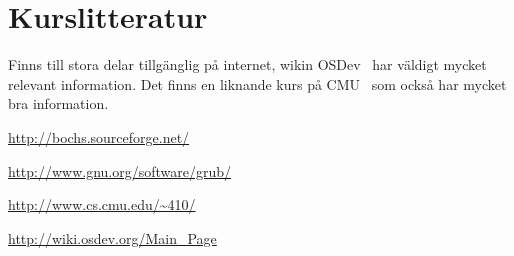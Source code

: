 \documentclass[11pt,oneside,a4paper]{article}
\begin{document}
\section{Kurslitteratur}
Finns till stora delar tillgänglig på internet, wikin OSDev~\cite{os}
 har väldigt mycket relevant information.
Det finns en liknande kurs på CMU~\cite{cmu} som också
har mycket bra information.

\begin{thebibliography}{9}
    \url{http://bochs.sourceforge.net/}

    \url{http://www.gnu.org/software/grub/}

    \url{http://www.cs.cmu.edu/~410/}

    \url{http://wiki.osdev.org/Main_Page}
\end{thebibliography}
\end{document}
